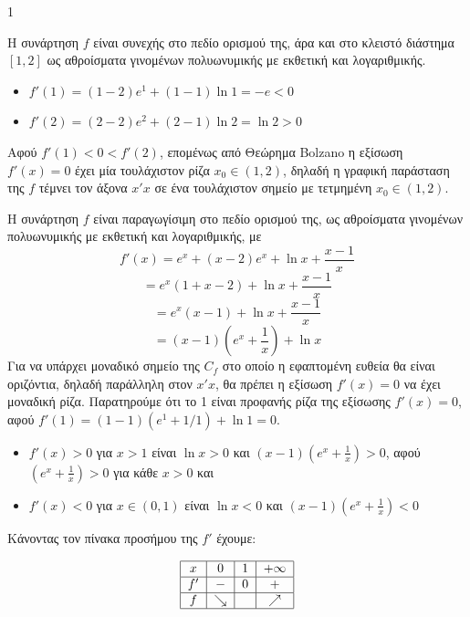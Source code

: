 \begin{ylh}{1}
    \item [Ύλη από εικόνα]
\end{ylh}


\begin{alist}
    \item Η συνάρτηση $f$ είναι συνεχής στο πεδίο ορισμού της, άρα και στο κλειστό διάστημα $[1,2]$ ως αθροίσματα γινομένων πολυωνυμικής με εκθετική και λογαριθμικής.
    \begin{itemize}
        \item $f'(1) = (1-2)e^1 + (1-1)\ln1 = -e < 0$
        \item $f'(2) = (2-2)e^2 + (2-1)\ln2 = \ln2 > 0$
    \end{itemize}
    Αφού $f'(1) < 0 < f'(2)$, επομένως από Θεώρημα Bolzano η εξίσωση $f'(x) = 0$ έχει μία τουλάχιστον ρίζα $x_0 \in (1,2)$, δηλαδή η γραφική παράσταση της $f$ τέμνει τον άξονα $x'x$ σε ένα τουλάχιστον σημείο με τετμημένη $x_0 \in (1,2)$. 
    \item Η συνάρτηση $f$ είναι παραγωγίσιμη στο πεδίο ορισμού της, ως αθροίσματα γινομένων πολυωνυμικής με εκθετική και λογαριθμικής, με
    \[ f'(x) = e^x + (x-2)e^x + \ln x + \frac{x-1}{x} \]
    \[ = e^x (1 + x-2) + \ln x + \frac{x-1}{x} \]
    \[ = e^x (x-1) + \ln x + \frac{x-1}{x} \]
    \[ = (x-1) \left(e^x + \frac{1}{x}\right) + \ln x \]
    Για να υπάρχει μοναδικό σημείο της $C_f$ στο οποίο η εφαπτομένη ευθεία θα είναι οριζόντια, δηλαδή παράλληλη στον $x'x$, θα πρέπει η εξίσωση $f'(x)=0$ να έχει μοναδική ρίζα.
    Παρατηρούμε ότι το 1 είναι προφανής ρίζα της εξίσωσης $f'(x)=0$, αφού
    $f'(1) = (1-1)(e^1+1/1)+\ln1 = 0$.
    \begin{itemize}
        \item $f'(x) > 0$ για $x>1$ είναι $\ln x > 0$ και $(x-1) \left(e^x + \frac{1}{x}\right) > 0$, αφού $\left(e^x + \frac{1}{x}\right) > 0$ για κάθε $x>0$ και
        \item $f'(x) < 0$ για $x \in (0,1)$ είναι $\ln x < 0$ και $(x-1) \left(e^x + \frac{1}{x}\right) < 0$
    \end{itemize}
    Κάνοντας τον πίνακα προσήμου της $f'$ έχουμε:

    \[
    \begin{tabular}{|c|c|c|c|}
    \hline
    $x$ & 0 & 1 & $+\infty$ \\
    \hline
    $f'$ & $-$ & 0 & $+$ \\
    \hline
    $f$ & $\searrow$ & & $\nearrow$ \\
    \hline
    \end{tabular}
    \]


\end{alist}

